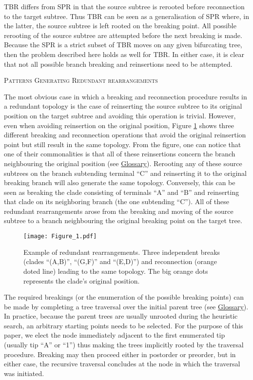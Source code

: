 \documentclass[12pt,letterpaper]{article}
\renewcommand{\section}[1]{%
\bigskip
\begin{center}
\begin{Large}
\normalfont\scshape #1
\medskip
\end{Large}
\end{center}}
\begin{document}
TBR differs from SPR in that the source subtree is rerooted before reconnection to the target subtree.
Thus TBR can be seen as a generalisation of SPR where, in the latter, the source subtree is left rooted on the breaking point.
All possible rerooting of the source subtree are attempted before the next breaking is made.
Because the SPR is a strict subset of TBR moves on any given bifurcating tree, then the problem described here holds as well for TBR.
In either case, it is clear that not all possible branch breaking and reinsertions need to be attempted.

\section{Patterns Generating Redundant rearrangements}
The most obvious case in which a breaking and reconnection procedure results in a redundant topology is the case of reinserting the source subtree to its original position on the target subtree and avoiding this operation is trivial.
However, even when avoiding reinsertion on the original position, Figure \ref{Figure_redundant} shows three different breaking and reconnection operations that avoid the original reinsertion point but still result in the same topology. 
From the figure, one can notice that one of their commonalities is that all of these reinsertions concern the branch neighbouring the original position (see \hyperref[Glossary]{Glossary}).
Rerooting any of these source subtrees on the branch subtending terminal ``C'' and reinserting it to the original breaking branch will also generate the same topology.
Conversely, this can be seen as breaking the clade consisting of terminals ``A'' and ``B'' and reinserting that clade on its neighboring branch (the one subtending ``C'').
All of these redundant rearrangements arose from the breaking and moving of the source subtree to a branch neighbouring the original breaking point on the target tree.

\begin{figure}[!htbp]
\centering
   \texttt{[image: Figure\_1.pdf]}
\caption{Example of redundant rearrangements. Three independent breaks (clades ``(A,B)'', ``(G,F)'' and ``(E,D)'') and reconnection (orange doted line) leading to the same topology. The big orange dots represents the clade's original position.}
\label{Figure_redundant}
\end{figure}

The required breakings (or the enumeration of the possible breaking points) can be made by completing a tree traversal over the initial parent tree (see \hyperref[Glossary]{Glossary}).
In practice, because the parent trees are usually unrooted during the heuristic search, an arbitrary starting points needs to be selected.
For the purpose of this paper, we elect the node immediately adjacent to the first enumerated tip (usually tip ``A'' or ``1'') thus making the trees implicitly rooted by the traversal procedure.
Breaking may then proceed either in postorder or preorder, but in either case, the recursive traversal concludes at the node in which the traversal was initiated.
\end{document}
